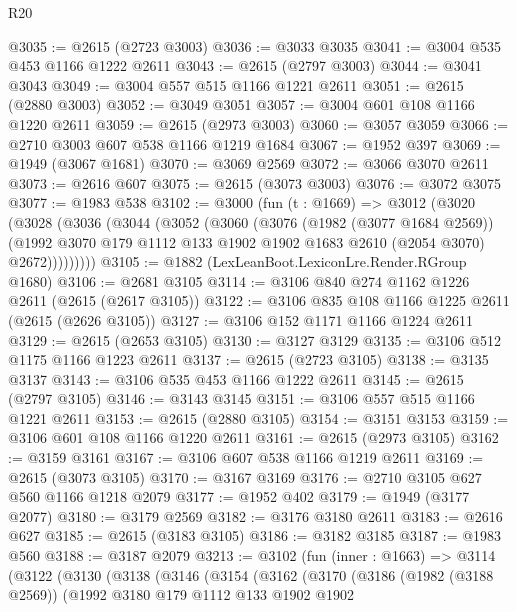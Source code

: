 \begin{lexlean}{R20}
\begin{coremodule}
@3035 := @2615 (@2723 @3003)
@3036 := @3033 @3035
@3041 := @3004 @535 @453 @1166 @1222 @2611
@3043 := @2615 (@2797 @3003)
@3044 := @3041 @3043
@3049 := @3004 @557 @515 @1166 @1221 @2611
@3051 := @2615 (@2880 @3003)
@3052 := @3049 @3051
@3057 := @3004 @601 @108 @1166 @1220 @2611
@3059 := @2615 (@2973 @3003)
@3060 := @3057 @3059
@3066 := @2710 @3003 @607 @538 @1166 @1219 @1684
@3067 := @1952 @397
@3069 := @1949 (@3067 @1681)
@3070 := @3069 @2569
@3072 := @3066 @3070 @2611
@3073 := @2616 @607
@3075 := @2615 (@3073 @3003)
@3076 := @3072 @3075
@3077 := @1983 @538
@3102 := @3000
    (fun (t : @1669) =>
    @3012
      (@3020
        (@3028
          (@3036
            (@3044
              (@3052
                (@3060
                  (@3076
                    (@1982 (@3077 @1684 @2569))
                    (@1992
                      @3070
                      @179
                      @1112
                      @133
                      @1902
                      @1902
                      @1683
                      @2610
                      (@2054 @3070)
                      @2672)))))))))
@3105 := @1882 (LexLeanBoot.LexiconLre.Render.RGroup @1680)
@3106 := @2681 @3105
@3114 := @3106 @840 @274 @1162 @1226 @2611 (@2615 (@2617 @3105))
@3122 := @3106 @835 @108 @1166 @1225 @2611 (@2615 (@2626 @3105))
@3127 := @3106 @152 @1171 @1166 @1224 @2611
@3129 := @2615 (@2653 @3105)
@3130 := @3127 @3129
@3135 := @3106 @512 @1175 @1166 @1223 @2611
@3137 := @2615 (@2723 @3105)
@3138 := @3135 @3137
@3143 := @3106 @535 @453 @1166 @1222 @2611
@3145 := @2615 (@2797 @3105)
@3146 := @3143 @3145
@3151 := @3106 @557 @515 @1166 @1221 @2611
@3153 := @2615 (@2880 @3105)
@3154 := @3151 @3153
@3159 := @3106 @601 @108 @1166 @1220 @2611
@3161 := @2615 (@2973 @3105)
@3162 := @3159 @3161
@3167 := @3106 @607 @538 @1166 @1219 @2611
@3169 := @2615 (@3073 @3105)
@3170 := @3167 @3169
@3176 := @2710 @3105 @627 @560 @1166 @1218 @2079
@3177 := @1952 @402
@3179 := @1949 (@3177 @2077)
@3180 := @3179 @2569
@3182 := @3176 @3180 @2611
@3183 := @2616 @627
@3185 := @2615 (@3183 @3105)
@3186 := @3182 @3185
@3187 := @1983 @560
@3188 := @3187 @2079
@3213 := @3102
    (fun (inner : @1663) =>
    @3114
      (@3122
        (@3130
          (@3138
            (@3146
              (@3154
                (@3162
                  (@3170
                    (@3186
                      (@1982 (@3188 @2569))
                      (@1992
                        @3180
                        @179
                        @1112
                        @133
                        @1902
                        @1902

\end{coremodule}
\end{lexlean}
